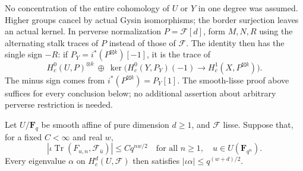No concentration of the entire cohomology of $U$ or $Y$ in one degree was
assumed.  Higher groups cancel by actual Gysin isomorphisms; the border
surjection leaves an actual kernel.  In perverse normalization
$P=\mathcal F[d]$, form $M,N,R$ using the alternating stalk traces of
$P$ instead of those of $\mathcal F$.  The identity then has the single sign $-R$:
if $P_Y=i^*(P^{\boxtimes k})[-1]$, it is the trace of
\[
 H_c^0(U,P)^{\otimes k}\ \oplus\
 \ker\bigl(H_c^0(Y,P_Y)(-1)\longrightarrow
                         H_c^1(X,P^{\boxtimes k})\bigr).
\]
The minus sign comes from $i^*(P^{\boxtimes k})=P_Y[1]$.
The smooth-lisse proof above suffices for every conclusion below; no
additional assertion about arbitrary perverse restriction is needed.

\begin{theorem}
\label{thm:affine}
Let $U/\mathbf F_q$ be smooth affine of pure dimension $d\ge1$, and
$\mathcal F$ lisse.  Suppose that, for a fixed $C<\infty$ and real $w$,
\[
 |\iota\operatorname{Tr}(F_{u,n},\mathcal F_{\bar u})|
       \le Cq^{nw/2}
 \quad\text{for all }n\ge1,\quad u\in U(\mathbf F_{q^n}).
\]
Every eigenvalue $\alpha$ on $H_c^d(U,\mathcal F)$ then satisfies
$|\iota\alpha|\le q^{(w+d)/2}$.
\end{theorem}
